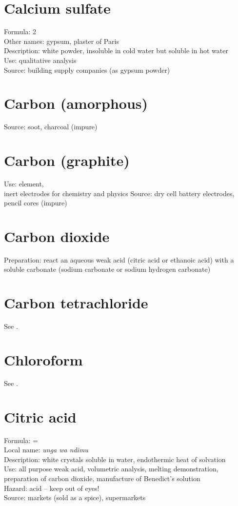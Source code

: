 \section{Calcium sulfate}
Formula:  2\\
Other names: gypsum, 
plaster of Paris\\
Description: white powder, 
insoluble in cold water but soluble in hot water\\
Use: qualitative analysis\\
Source: building supply companies (as gypsum powder)

\section{Carbon (amorphous)}
Source: soot, 
charcoal (impure)

\section{Carbon (graphite)}
\label{sec:carbongraphite}
Use: element, \\
inert electrodes for chemistry and physics
Source: dry cell battery electrodes, 
pencil cores (impure)

\section{Carbon dioxide}
Preparation: react an aqueous weak acid 
(citric acid or ethanoic acid) with a soluble carbonate 
(sodium carbonate or sodium hydrogen carbonate)

\section{Carbon tetrachloride}
See .

\section{Chloroform}
See .

\section{Citric acid}
Formula:  =  \\
Local name: \textit{unga wa ndimu}\\
Description: white crystals soluble in water, 
endothermic heat of solvation\\
Use: all purpose weak acid, 
volumetric analysis, 
melting demonstration, 
preparation of carbon dioxide, 
manufacture of Benedict's solution\\
Hazard: acid – keep out of eyes!\\
Source: markets (sold as a spice), 
supermarkets


